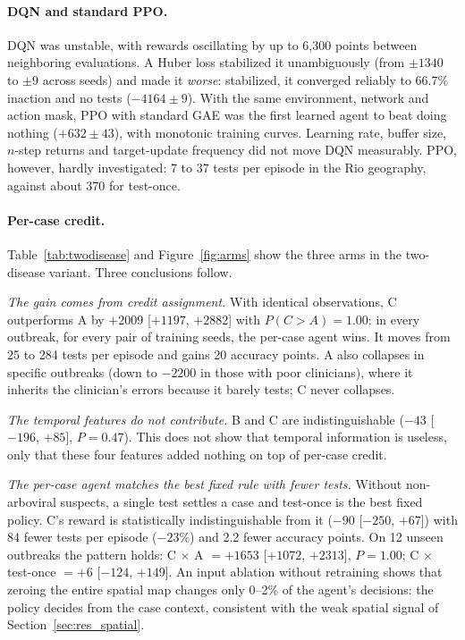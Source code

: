 \documentclass[11pt,a4paper]{article}
\begin{document}
\paragraph{DQN and standard PPO.} DQN was unstable, with rewards oscillating by up to 6{,}300 points between neighboring evaluations. A Huber loss stabilized it unambiguously (from $\pm1340$ to $\pm9$ across seeds) and made it \emph{worse}: stabilized, it converged reliably to 66.7\% inaction and no tests ($-4164 \pm 9$). With the same environment, network and action mask, PPO with standard GAE was the first learned agent to beat doing nothing ($+632 \pm 43$), with monotonic training curves. Learning rate, buffer size, $n$-step returns and target-update frequency did not move DQN measurably. PPO, however, hardly investigated: 7 to 37 tests per episode in the Rio geography, against about 370 for test-once.

\paragraph{Per-case credit.} Table~\ref{tab:twodisease} and Figure~\ref{fig:arms} show the three arms in the two-disease variant. Three conclusions follow.

\emph{The gain comes from credit assignment.} With identical observations, C outperforms A by $+2009$ [$+1197$, $+2882$] with $P(C>A) = 1.00$: in every outbreak, for every pair of training seeds, the per-case agent wins. It moves from 25 to 284 tests per episode and gains 20 accuracy points. A also collapses in specific outbreaks (down to $-2200$ in those with poor clinicians), where it inherits the clinician's errors because it barely tests; C never collapses.

\emph{The temporal features do not contribute.} B and C are indistinguishable ($-43$ [$-196$, $+85$], $P = 0.47$). This does not show that temporal information is useless, only that these four features added nothing on top of per-case credit.

\emph{The per-case agent matches the best fixed rule with fewer tests.} Without non-arboviral suspects, a single test settles a case and test-once is the best fixed policy. C's reward is statistically indistinguishable from it ($-90$ [$-250$, $+67$]) with 84 fewer tests per episode ($-23\%$) and 2.2 fewer accuracy points. On 12 unseen outbreaks the pattern holds: C $\times$ A $= +1653$ [$+1072$, $+2313$], $P = 1.00$; C $\times$ test-once $= +6$ [$-124$, $+149$]. An input ablation without retraining shows that zeroing the entire spatial map changes only 0--2\% of the agent's decisions: the policy decides from the case context, consistent with the weak spatial signal of Section~\ref{sec:res_spatial}.
\end{document}
